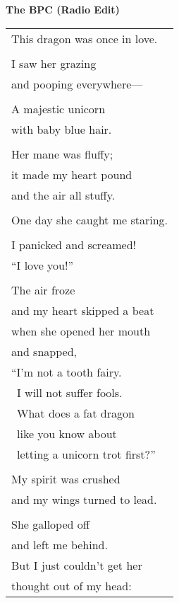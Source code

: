\documentclass{article}
\begin{document}
\newcommand{\h}{\hspace*{2ex}}
\newcommand{\HHHH}{\hspace*{32ex}}

\begin{center}
\large\textbf{The BPC (Radio Edit)}\hspace*{15ex}
\end{center}
\begin{center}
\begin{tabular}{l}
\\
This dragon was once in love. \\
\\
I saw her grazing \\
\h and pooping everywhere--- \\
\\
A majestic unicorn \\
\h with baby blue hair. \\
\\
Her mane was fluffy; \\
\h it made my heart pound \\
\h and the air all stuffy. \\
\\
One day she caught me staring. \\
\\
I panicked and screamed! \\
\h ``I love you!'' \\
\\
The air froze \\
\h and my heart skipped a beat \\
\h when she opened her mouth \\
\h and snapped, \\
\h ``I'm not a tooth fairy. \\
\h\ I will not suffer fools. \\
\h\ What does a fat dragon \\
\h\ like you know about \\
\h\ letting a unicorn trot first?'' \\
\\
My spirit was crushed \\
\h and my wings turned to lead. \\
\\
She galloped off \\
\h and left me behind. \\
But I just couldn't get her \\
\h thought out of my head: \\

\end{tabular}
\end{center}
\end{document}

